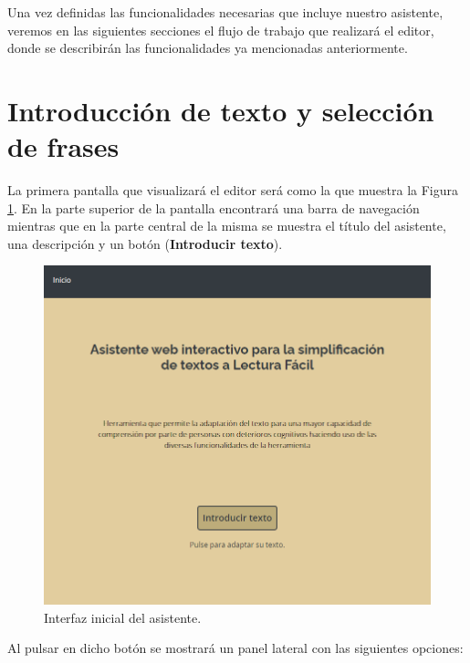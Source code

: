  

Una vez definidas las funcionalidades necesarias que incluye nuestro asistente, veremos en las siguientes secciones el flujo de trabajo que realizará el editor, donde se describirán las funcionalidades ya mencionadas anteriormente.

\section{Introducción de texto y selección de frases}
\label{introduccionTextoYFrases}
 La primera pantalla que visualizará el editor será como la que muestra la Figura \ref{fig:interfazInicial}. En la parte superior de la pantalla encontrará una barra de navegación mientras que en la parte central de la misma se muestra el título del asistente, una descripción y un botón (\textbf{Introducir texto}). 
  \begin{figure}[h!]
 	\centering
 	
 	
 	\includegraphics[scale=1]{Imagenes/Figuras/InterfazInicial}
 	
 	
 	\caption{Interfaz inicial del asistente.}
 	\label{fig:interfazInicial}
 \end{figure}
 
 Al pulsar en dicho botón se mostrará un panel lateral con las siguientes opciones:
 
